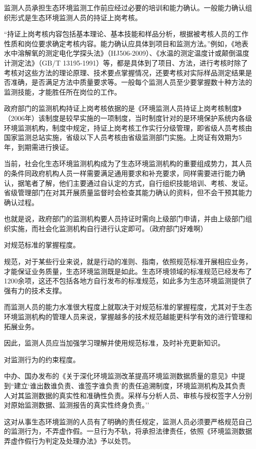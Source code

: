 \documentclass[
]{book}
\begin{document}
监测人员承担生态环境监测工作前应经过必要的培训和能力确认。一般能力确认组织形式是生态环境监测人员的持证上岗考核。

``持证上岗考核内容包括基本理论、基本技能和样品分析，根据被考核人员的工作性质和岗位要求确定考核内容。能力确认应具体到项目和监测方法。''例如，《地表水中溶解氧的测定电化学探头法》（HJ506-2009）、《水温的测定温度计或颠倒温度计测定法》（GB/T 13195-1991）等，都是具体到了项目、方法，进行考核时除了考核对这些方法的理论原理、技术要点掌握情况，还要考核对实际样品测定结果是否准确，是否满足方法中质量要求等。一般每个监测人员至少要掌握数十种方法的监测技能，才能胜任所在岗位的工作。

政府部门的监测机构持证上岗考核依据的是《环境监测人员持证上岗考核制度》（2006年）该制度是较早实施的一项制度，当时制度针对的是环境保护系统内各级环境监测机构，制度中规定，持证上岗考核工作实行分级管理，即省级人员考核由国家监测总站实施，省级以下人员考核由省级监测部门实施。上岗证有效期为5年，到期需进行换证。

当前，社会化生态环境监测机构成为了生态环境监测机构的重要组成势力，其人员的条件同政府机构人员一样需要满足通用要求和补充要求，同样需要进行能力确认，据笔者了解，他们主要通过自认定的方式，自行组织技能培训、考核、发证。省级管理部门在对其开展质量监督时会检查其能力确认的资料，但不会干预其能力确认过程。

也就是说，政府部门的监测机构要人员持证时需向上级部门申请，并由上级部门组织实施，而社会化监测机构自行进行认定即可。（政府部门好难啊）

对规范标准的掌握程度。

规范，对于某些行业来说，就是行动的准则、指南，依照规范标准开展相应业务，才能保证业务质量，生态环境监测既是如此。生态环境领域的标准规范已经发布了1200余项，这还不包括各地方自行发布的标准规范，如此多为生态环境监测提供了强有力的技术支撑。

而监测人员的能力水准很大程度上就取决于对规范标准的掌握程度，尤其对于生态环境监测机构的管理人员来说，掌握越多的技术规范越能更科学有效的进行管理和拓展业务。

因此，监测人员应当加强学习理解并使用规范标准，及时补充更新知识。

对监测行为的约束程度。

中办、国办发布的《关于深化环境监测改革提高环境监测数据质量的意见》中提到``建立`谁出数谁负责、谁签字谁负责'的责任追溯制度，环境监测机构及其负责人对其监测数据的真实性和准确性负责。采样与分析人员、审核与授权签字人分别对原始监测数据、监测报告的真实性终身负责。''

这对从事生态环境监测的人员有了明确的责任规定，监测人员必须要严格规范自己的监测行为，不弄虚作假。一旦行为不轨，将承担法律责任，依照《环境监测数据弄虚作假行为判定及处理办法》予以处罚。
\end{document}
